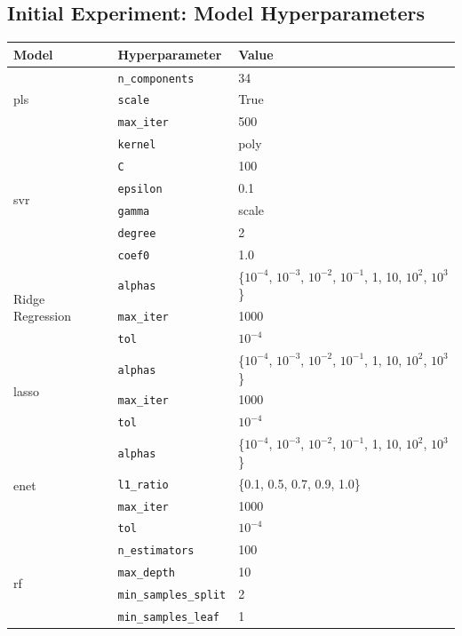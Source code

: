\FloatBarrier

\subsection{Initial Experiment: Model Hyperparameters}\label{subsec:initial_experiment_hyperparameters}
\begin{table}[!htb]
\centering
\begin{tabular}{@{}llp{}@{}}
\toprule
\textbf{Model} & \textbf{Hyperparameter} & \textbf{Value} \\
\midrule
\multirow{3}{*}{\gls{pls}}
& \texttt{n\_components} & 34 \\
& \texttt{scale} & True \\
& \texttt{max\_iter} & 500 \\
\midrule
\multirow{6}{*}{\gls{svr}}
& \texttt{kernel} & poly \\
& \texttt{C} & 100 \\
& \texttt{epsilon} & 0.1 \\
& \texttt{gamma} & scale \\
& \texttt{degree} & 2 \\
& \texttt{coef0} & 1.0 \\
\midrule
\multirow{3}{*}{Ridge Regression}
& \texttt{alphas} & \{$10^{-4}$, $10^{-3}$, $10^{-2}$, $10^{-1}$, 1, 10, $10^2$, $10^3$\} \\
& \texttt{max\_iter} & 1000 \\
& \texttt{tol} & $10^{-4}$ \\
\midrule
\multirow{3}{*}{\gls{lasso}}
& \texttt{alphas} & \{$10^{-4}$, $10^{-3}$, $10^{-2}$, $10^{-1}$, 1, 10, $10^2$, $10^3$\} \\
& \texttt{max\_iter} & 1000 \\
& \texttt{tol} & $10^{-4}$ \\
\midrule
\multirow{4}{*}{\gls{enet}}
& \texttt{alphas} & \{$10^{-4}$, $10^{-3}$, $10^{-2}$, $10^{-1}$, 1, 10, $10^2$, $10^3$\} \\
& \texttt{l1\_ratio} & \{0.1, 0.5, 0.7, 0.9, 1.0\} \\
& \texttt{max\_iter} & 1000 \\
& \texttt{tol} & $10^{-4}$ \\
\midrule
\multirow{6}{*}{\gls{rf}}
& \texttt{n\_estimators} & 100 \\
& \texttt{max\_depth} & 10 \\
& \texttt{min\_samples\_split} & 2 \\
& \texttt{min\_samples\_leaf} & 1 \\

\end{tabular}
\end{table}
